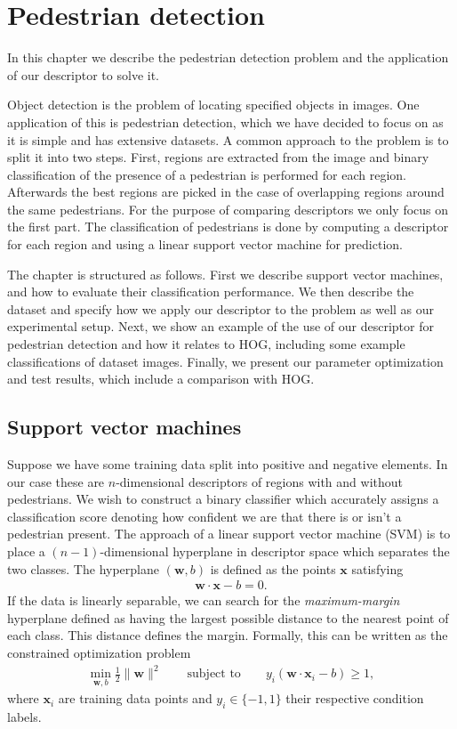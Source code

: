 \documentclass[thesis.tex]{subfiles}
\def\x{\mathbf{x}}
\def\w{\mathbf{w}}
\begin{document}
\chapter{Pedestrian detection}
\label{sec:od}
%
In this chapter we describe the pedestrian detection problem and the application of our descriptor to solve it.

Object detection is the problem of locating specified objects in images. One application of this is pedestrian detection, which we have decided to focus on as it is simple and has extensive datasets. A common approach to the problem is to split it into two steps. First, regions are extracted from the image and binary classification of the presence of a pedestrian is performed for each region. Afterwards the best regions are picked in the case of overlapping regions around the same pedestrians. For the purpose of comparing descriptors we only focus on the first part. The classification of pedestrians is done by computing a descriptor for each region and using a linear support vector machine for prediction.

The chapter is structured as follows. First we describe support vector machines, and how to evaluate their classification performance. We then describe the dataset and specify how we apply our descriptor to the problem as well as our experimental setup. Next, we show an example of the use of our descriptor for pedestrian detection and how it relates to HOG, including some example classifications of dataset images. Finally, we present our parameter optimization and test results, which include a comparison with HOG.
%
\section{Support vector machines}
%
Suppose we have some training data split into positive and negative elements. In our case these are $n$-dimensional descriptors of regions with and without pedestrians. We wish to construct a binary classifier which accurately assigns a classification score denoting how confident we are that there is or isn't a pedestrian present. The approach of a linear support vector machine (SVM) is to place a $(n-1)$-dimensional hyperplane in descriptor space which separates the two classes. The hyperplane $(\w,b)$ is defined as the points $\x$ satisfying
%
\begin{align*}
\w \cdot \x - b = 0.
\end{align*}
%
If the data is linearly separable, we can search for the \emph{maximum-margin} hyperplane defined as having the largest possible distance to the nearest point of each class. This distance defines the margin. Formally, this can be written as the constrained optimization problem
%
\begin{align*}
\min_{\w,b} \frac12 \| \w \|^2 \qquad \text{subject to} \qquad y_i (\w \cdot \x_i - b) \geq 1,
\end{align*}
%
where $\x_i$ are training data points and $y_i \in \{-1,1\}$ their respective condition labels.
\end{document}
